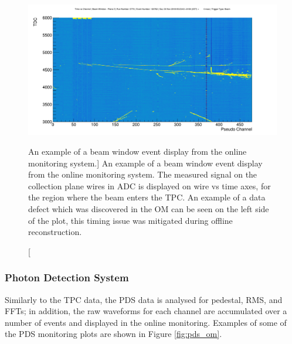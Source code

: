 \begin{figure}

	\centering

	\includegraphics[width=\textwidth]{figures/beam_evd.png}

	\caption
	[An example of a beam window event display from the \protodune{} online
	monitoring system.]
	{An example of a beam window event display from the \protodune{} online
	monitoring system. The measured signal on the collection plane wires in ADC 
	is displayed on wire vs time axes, for the region where the beam enters the 
	TPC. An example of a data defect which was discovered in the OM can be seen 
	on the left side of the plot, this timing issue was mitigated during offline
	reconstruction.}

	\label{fig:beam_evd}

\end{figure}

\subsubsection*{Photon Detection System}
Similarly to the TPC data, the PDS data is analysed for pedestal, RMS, and FFTs;
in addition, the raw waveforms for each channel are accumulated over a number of
events and displayed in the online monitoring. Examples of some of the PDS 
monitoring plots are shown in Figure \ref{fig:pds_om}.

